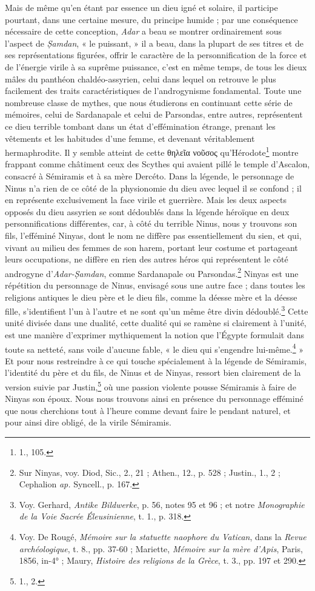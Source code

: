 \documentclass[a4paper, 11pt, oneside, landscape]{article}
\begin{document}
Mais de même qu'en étant par essence un dieu igné et solaire, il participe pourtant, dans une certaine mesure, du principe humide ; par une conséquence nécessaire de cette conception, \emph{Adar} a beau se montrer ordinairement sous l'aspect de \emph{\d{S}amdan}, « le puissant, » il a beau, dans la plupart de ses titres et de ses représentations figurées, offrir le caractère de la personnification de la force et de l'énergie virile à sa suprême puissance, c'est en même temps, de tous les dieux mâles du panthéon chaldéo-assyrien, celui dans lequel on retrouve le plus facilement des traits caractéristiques de l'androgynisme fondamental. Toute une nombreuse classe de mythes, que nous étudierons en continuant cette série de mémoires, celui de Sardanapale et celui de Parsondas, entre autres, représentent ce dieu terrible tombant dans un état d'effémination étrange, prenant les vêtements et les habitudes d'une femme, et devenant véritablement hermaphrodite. Il y semble atteint de cette θηλεῖα νοῦσος qu'Hérodote\footnote{1., 105.} montre frappant comme châtiment ceux des Scythes qui avaient pillé le temple d'Ascalon, consacré à Sémiramis et à sa mère Dercéto. Dans la légende, le personnage de Ninus n'a rien de ce côté de la physionomie du dieu avec lequel il se confond ; il en représente exclusivement la face virile et guerrière. Mais les deux aspects opposés du dieu assyrien se sont dédoublés dans la légende héroïque en deux personnifications différentes, car, à côté du terrible Ninus, nous y trouvons son fils, l'efféminé Ninyas, dont le nom ne diffère pas essentiellement du sien, et qui, vivant au milieu des femmes de son harem, portant leur costume et partageant leurs occupations, ne diffère en rien des autres héros qui représentent le côté androgyne d'\emph{Adar-\d{S}amdan}, comme Sardanapale ou Parsondas.\footnote{Sur Ninyas, voy. Diod, Sic., 2., 21 ; Athen., 12., p. 528 ; Justin., 1., 2 ; Cephalion \emph{ap.} Syncell., p. 167.} Ninyas est une répétition du personnage de Ninus, envisagé sous une autre face ; dans toutes les religions antiques le dieu père et le dieu fils, comme la déesse mère et la déesse fille, s'identifient l'un à l'autre et ne sont qu'un même être divin dédoublé.\footnote{Voy. Gerhard, \emph{Antike Bildwerke}, p. 56, notes 95 et 96 ; et notre \emph{Monographie de la Voie Sacrée Éleusinienne}, t. 1., p. 318.} Cette unité divisée dans une dualité, cette dualité qui se ramène si clairement à l'unité, est une manière d'exprimer mythiquement la notion que l'Égypte formulait dans toute sa netteté, sans voile d'aucune fable, « le dieu qui s'engendre lui-même.\footnote{Voy. De Rougé, \emph{Mémoire sur la statuette naophore du Vatican}, dans la \emph{Revue archéologique}, t. 8., pp. 37-60 ; Mariette, \emph{Mémoire sur la mère d'Apis}, Paris, 1856, in-4° ; Maury, \emph{Histoire des religions de la Grèce}, t. 3., pp. 197 et 290.} » Et pour nous restreindre à ce qui touche spécialement à la légende de Sémiramis, l'identité du père et du fils, de Ninus et de Ninyas, ressort bien clairement de la version suivie par Justin,\footnote{1., 2.} où une passion violente pousse Sémiramis à faire de Ninyas son époux. Nous nous trouvons ainsi en présence du personnage efféminé que nous cherchions tout à l'heure comme devant faire le pendant naturel, et pour ainsi dire obligé, de la virile Sémiramis.
\end{document}
